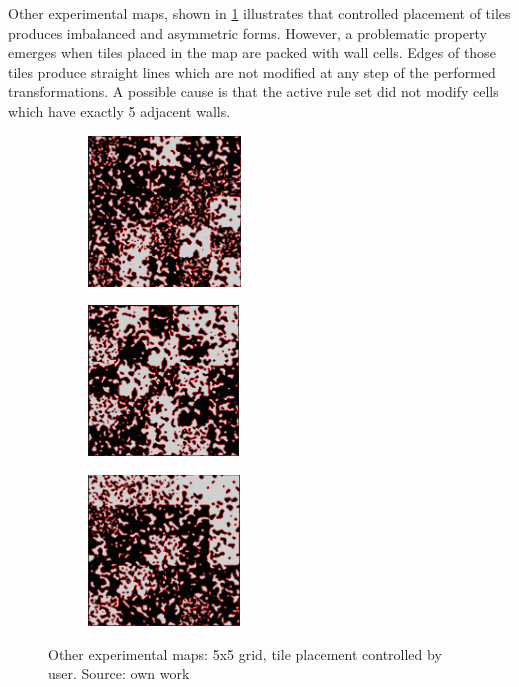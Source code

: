 \documentclass[12pt]{report}
\begin{document}
Other experimental maps, shown in \cref{fig:ex2} illustrates that controlled placement of tiles produces imbalanced and asymmetric forms. However, a problematic property emerges when tiles placed in the map are packed with wall cells. Edges of those tiles produce straight lines which are not modified at any step of the performed transformations. A possible cause is that the active rule set did not modify cells which have exactly 5 adjacent walls.

\begin{figure}[th]
	\centering
	\begin{subfigure}[t]{0.3\textwidth}
		\centering
		\includegraphics[height=4cm]{images/ex2a}
		\caption{} 
	\end{subfigure}  
	\hfill
	\begin{subfigure}[t]{0.3\textwidth}
		\centering
		\includegraphics[height=4cm]{images/ex2b}
		\caption{} 
	\end{subfigure} 
		\hfill
	\begin{subfigure}[t]{0.3\textwidth}
		\centering
		\includegraphics[height=4cm]{images/ex2c}
		\caption{} 
	\end{subfigure}
	\caption{Other experimental maps: 5x5 grid, tile placement controlled by user. Source: own work}
	\label{fig:ex2}
\end{figure}
\end{document}
